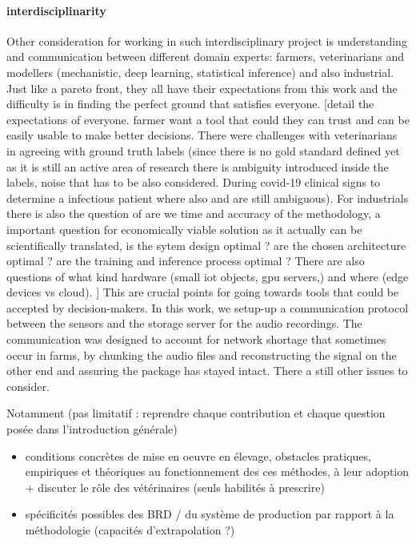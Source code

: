 \paragraph{interdisciplinarity} Other consideration for working in such interdisciplinary project is understanding and communication between different domain experts: farmers, veterinarians and modellers (mechanistic, deep learning, statistical inference) and also industrial. Just like a pareto front, they all have their expectations from this work and the difficulty is in finding the perfect ground that satisfies everyone. [detail the expectations of everyone. farmer want a tool that could they can trust and can be easily usable to make better decisions. There were challenges with veterinarians in agreeing with ground truth labels (since there is no gold standard defined yet as it is still an active area of research there is ambiguity introduced inside the labels, noise that has to be also considered. During covid-19 clinical signs to determine a infectious patient where also and are still ambiguous). For industrials there is also the question of are we time and accuracy of the methodology, a important question for economically viable solution as it actually can be scientifically translated, is the sytem design optimal ? are the chosen architecture optimal ? are the training and inference process optimal ? There are also questions of what kind hardware (small iot objects, gpu servers,) and where (edge devices vs cloud). ] This are crucial points for going towards tools that could be accepted by decision-makers. In this work, we setup-up a communication protocol between the sensors and the storage server for the audio recordings. The communication was designed to account for network shortage that sometimes occur in farms, by chunking the audio files and reconstructing the signal on the other end and assuring the package has stayed intact. There a still other issues to consider.

Notamment (pas limitatif : reprendre chaque contribution et chaque question posée dans l'introduction générale)
\begin{itemize}
    \item conditions concrètes de mise en oeuvre en élevage, obstacles pratiques, empiriques et théoriques au fonctionnement des ces méthodes, à leur adoption + discuter le rôle des vétérinaires (seuls habilités à prescrire)
    \item spécificités possibles des BRD / du système de production par rapport à la méthodologie (capacités d'extrapolation ?)
\end{itemize}


